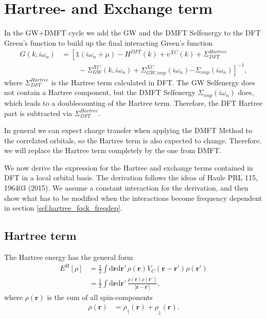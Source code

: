 \documentclass[12pt,a4paper]{scrartcl}
\numberwithin{equation}{section}
\newcommand{\unity}{\mathds{1}}
\renewcommand{\vec}{\mathbf}
\begin{document}
\section{Hartree- and Exchange term}
\label{sec:hartree_exchange}
In the GW+DMFT cycle we add the GW and the DMFT Selfenergy to the DFT Green's function
to build up the final interacting Green's function
\begin{align}
 G(k,i\omega_n) 
 &= \left[ \unity(i\omega_n+\mu ) -H^{DFT}(k) + v^{XC}(k) + \Sigma^{Hartree}_{DFT} \right.\nonumber\\
          & \hspace{1cm}- \Sigma^{XC}_{GW}(k,i\omega_n) 
          + \Sigma_{GW,imp}^{XC}(i\omega_n)
          \left. - \Sigma_{imp}(i\omega_n)
           \right]^{-1},
\end{align}
where $\Sigma_{DFT}^{Hartree}$ is the Hartree term calculated in DFT.
The GW Selfenergy does not contain a Hartree component, 
but the DMFT Selfenergy $\Sigma_{imp}(i\omega_n)$ does, which leads
to a doublecounting of the Hartree term. Therefore, the DFT Hartree part
is subtracted via $\Sigma_{DFT}^{Hartree}$.

In general we can expect charge transfer when applying the
DMFT Method to the correlated orbitals, so the Hartree term is also 
expected to change. 
Therefore, we will replace the Hartree term completely by the one from DMFT.

We now derive the expression for the Hartree and exchange terms
contained in DFT in a local orbital basis.
The derivation follows the ideas of Haule PRL 115, 196403 (2015).
We assume a constant interaction for the derivation, and then 
show what has to be modified when the interactions become
frequency dependent in section \ref{sef:hartree_fock_freqdep}.

\subsection{Hartree term}
The Hartree energy has the general form
\begin{align}
E^H[\rho]
%
&= \frac{1}{2}\int \mathrm{d}\vec{r}\mathrm{d}\vec{r}' \, 
\rho(\vec{r}) V_C(\vec{r}-\vec{r}') \rho(\vec{r}') \\
%
&= \frac{1}{2} \int \mathrm{d}\vec{r}\mathrm{d}\vec{r}' \,
\frac{\rho(\vec{r}) \rho(\vec{r}') }{|\vec{r}-\vec{r}'|},
\end{align}
where $\rho(\vec{r})$ is the sum of all spin-components
\begin{align}
\rho(\vec{r}) &= \rho_{\uparrow}(\vec{r}) + \rho_{\downarrow}(\vec{r}).
\end{align}
\end{document}
